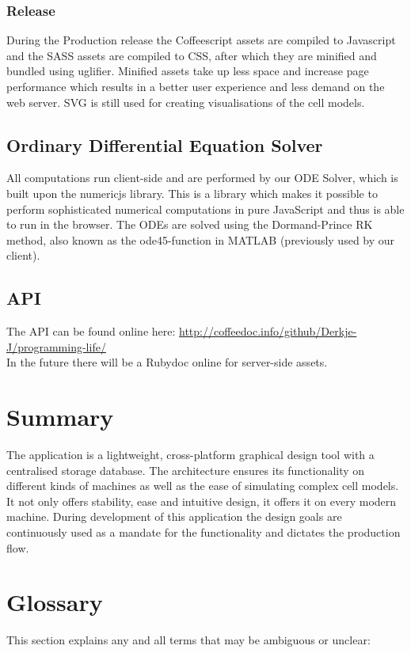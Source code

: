 \documentclass{report}
\begin{document}
			\subsubsection{Release}
				During the Production release the Coffeescript assets are compiled to Javascript\cite{javascript} and the SASS assets are compiled to CSS, after which they are minified and bundled using uglifier\cite{uglifier}. Minified assets take up less space and increase page performance which results in a better user experience and less demand on the web server. 
				SVG is still used for creating visualisations of the cell models.
		\newpage		
		
		\subsection{Ordinary Differential Equation Solver}
			All computations run client-side and are performed by our ODE Solver, which is built upon the numericjs\cite{numericjs} library. This is a library which makes it possible to perform sophisticated numerical computations in pure JavaScript and thus is able to run in the browser. The ODEs are solved using the Dormand-Prince RK method\cite{dormandprince}, also known as the ode45-function in MATLAB (previously used by our client).
			
		\subsection{API}
			The API can be found online here: \url{http://coffeedoc.info/github/Derkje-J/programming-life/} \\
			In the future there will be a Rubydoc online for server-side assets.
		\newpage
			
	\section{Summary}
		The application is a lightweight, cross-platform graphical design tool with a centralised storage database. The architecture ensures its functionality on different kinds of machines as well as the ease of simulating complex cell models. It not only offers stability, ease and intuitive design, it offers it on every modern machine. During development of this application the design goals are continuously used as a mandate for the functionality and dictates the production flow.
	\section{Glossary}
		This section explains any and all terms that may be ambiguous or unclear:\\
		
\end{document}
